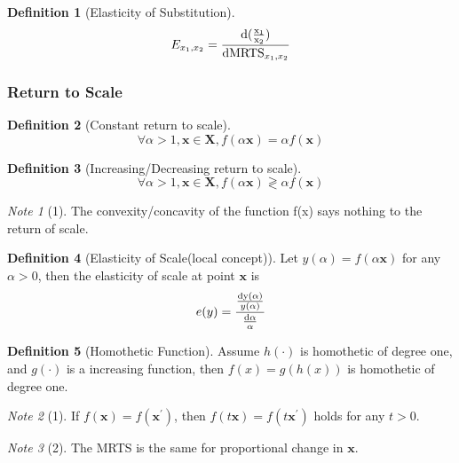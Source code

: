 \documentclass{article}
\theoremstyle{plain}
\theoremstyle{definition}
\newtheorem{defn}{Definition}[section]
\theoremstyle{remark}
\newtheorem*{note}{Note}
\begin{document}
\begin{defn}[Elasticity of Substitution]
\begin{equation}
	E_{x_1,x_2}= \frac{\rm{d}(\frac{x_1}{x_2})}{{\rm d} \text{MRTS}_{x_1,x_2}}	
\end{equation}
\end{defn}

\subsubsection{Return to Scale}
\begin{defn}[Constant return to scale]
\begin{equation}
	\forall \alpha >1, \bm{x}\in \bm{X}, f(\alpha \bm{x})= \alpha f(\bm{x})
\end{equation}
\end{defn}

\begin{defn}[Increasing/Decreasing return to scale]
\begin{equation}
	\forall \alpha >1, \bm{x}\in \bm{X}, f(\alpha \bm{x})\gtrless \alpha f(\bm{x})
\end{equation}
\end{defn}

\begin{note}[1]
	The convexity/concavity of the function f(x) says nothing to the return of scale.
\end{note}

\begin{defn}[Elasticity of Scale(local concept)]
	Let $y(\alpha) = f(\alpha \bm{x})$ for any $\alpha > 0$, then the elasticity of scale at point $\bm{x}$ is  
	\begin{equation}
		e(y) = \frac{\frac{\rm{d} y(\alpha)}{y(\alpha)}}{\frac{\rm{d} \alpha}{ \alpha}}
	\end{equation}
\end{defn}

\begin{defn}[Homothetic Function]
Assume $h(\cdot)$ is homothetic of degree one, and $g(\cdot)$  is a increasing function, then $f(x)=g(h(x))$ is homothetic of degree one.
\end{defn}

\begin{note}[1]
	If $f(\bm{x}) = f(\bm{x^{'}})$, then $f(t\bm{x}) = f(t\bm{x^{'}})$ holds for any $t>0$.
\end{note}

\begin{note}[2]
The MRTS is the same for proportional change in $\bm{x}$.
\end{note}
\end{document}
